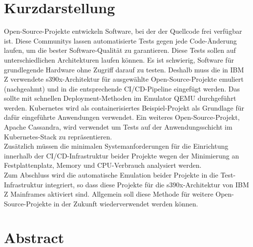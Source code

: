 \thispagestyle{empty}
\section*{Kurzdarstellung}
\label{sec:kurzdarstellung}
Open-Source-Projekte entwickeln Software, bei der der Quellcode frei verfügbar ist. Diese Communitys lassen automatisierte Tests gegen jede Code-Änderung laufen, um die bester Software-Qualität zu garantieren. 
Diese Tests sollen auf unterschiedlichen Architekturen laufen können. Es ist schwierig, Software für grundlegende Hardware ohne Zugriff darauf zu testen. Deshalb muss die in IBM Z verwendete s390x-Architektur für ausgewählte Open-Source-Projekte emuliert (nachgeahmt) und in die entsprechende CI/CD-Pipeline eingefügt werden. 
Das sollte mit schnellen Deployment-Methoden im Emulator QEMU durchgeführt werden. 
Kubernetes wird als containerisiertes Beispiel-Projekt als Grundlage für dafür eingeführte Anwendungen verwendet. Ein weiteres Open-Source-Projekt, Apache Cassandra, wird verwendet um Tests auf der Anwendungsschicht im Kubernetes-Stack zu repräsentieren. \\
Zusätzlich müssen die minimalen Systemanforderungen für die Einrichtung innerhalb der CI/CD-Infrastruktur beider Projekte wegen der Minimierung an Festplattenplatz, Memory und CPU-Verbrauch analysiert werden. \\
Zum Abschluss wird die automatische Emulation beider Projekte in die Test-Infrastruktur integriert, so dass diese Projekte für die s390x-Architektur von IBM Z Mainframes aktiviert sind. Allgemein soll diese Methode für weitere Open-Source-Projekte in der Zukunft wiederverwendet werden können.



\section*{Abstract}
\label{sec:abstract}

